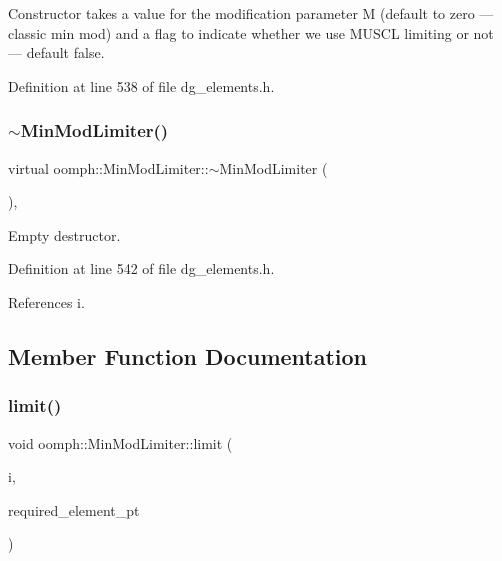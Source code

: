 Constructor takes a value for the modification parameter M (default to zero --- classic min mod) and a flag to indicate whether we use M\+U\+S\+CL limiting or not --- default false. 



Definition at line 538 of file dg\+\_\+elements.\+h.

\mbox{\label{classoomph_1_1MinModLimiter_aac8ae978f42ceddf1486702d84cf5b88}} 
\subsubsection{\texorpdfstring{$\sim$\+Min\+Mod\+Limiter()}{~MinModLimiter()}}
{\footnotesize\ttfamily virtual oomph\+::\+Min\+Mod\+Limiter\+::$\sim$\+Min\+Mod\+Limiter (\begin{DoxyParamCaption}{ }\end{DoxyParamCaption})\hspace{0.3cm}{\ttfamily [inline]}, {\ttfamily [virtual]}}



Empty destructor. 



Definition at line 542 of file dg\+\_\+elements.\+h.



References i.



\subsection{Member Function Documentation}
\mbox{\label{classoomph_1_1MinModLimiter_a95858e125f3ce738f6591caf7827ee4d}} 
\subsubsection{\texorpdfstring{limit()}{limit()}}
{\footnotesize\ttfamily void oomph\+::\+Min\+Mod\+Limiter\+::limit (\begin{DoxyParamCaption}\item[{const unsigned \&}]{i,  }\item[{const \hyperlink{classoomph_1_1Vector}{Vector}$<$ \hyperlink{classoomph_1_1DGElement}{D\+G\+Element} $\ast$$>$ \&}]{required\+\_\+element\+\_\+pt }\end{DoxyParamCaption})\hspace{0.3cm}{\ttfamily [virtual]}}



